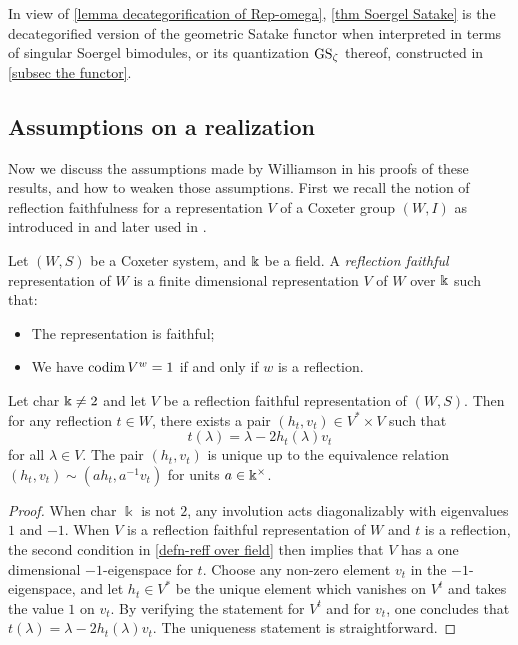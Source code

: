 In view of \cref{lemma decategorification of Rep-omega}, \cref{thm Soergel Satake} is the decategorified version of the geometric Satake functor when interpreted in terms of singular Soergel bimodules, or its quantization $\operatorname{GS}_\zeta$ thereof, constructed in \cref{subsec the functor}.

\subsection{Assumptions on a realization}


Now we discuss the assumptions made by Williamson in his proofs of these results, and how to weaken those assumptions.
First we recall the notion of reflection faithfulness for a representation $V$ of a Coxeter group $(W,I)$ as introduced in \cite{Soer07} and later used in \cite{WillSingular}.

\begin{defn}\label{defn-reff over field}
    Let $(W,S)$ be a Coxeter system, and $\Bbbk$ be a field. A \emph{reflection faithful} representation of $W$ is a finite
dimensional representation $V$ of $W$ over $\Bbbk$ such that:
\begin{itemize}
\item The representation is faithful;
\item 
We have $\operatorname{codim} V^w = 1$ if and only if $w$ is a reflection.
\end{itemize}
\end{defn}

\begin{lemma}\label{lemma reff implies (3')}
   Let char $\Bbbk \neq 2$ and let $V$ be a reflection faithful representation of $(W,S)$. Then for any reflection $t \in W$, there exists a pair $(h_t,v_t)\in V^* \times V$ such that 
   \[t(\lambda)=\lambda - 2h_t(\lambda)v_t\]
   for all $\lambda\in V$. The pair $(h_t, v_t)$ is unique up to the equivalence relation $(h_t, v_t) \sim (a h_t, a^{-1} v_t)$ for units $a \in \Bbbk^{\times}$.
\end{lemma}

\begin{proof}
When char $\Bbbk$ is not $2$, any involution acts diagonalizably with eigenvalues $1$ and $-1$.
When $V$ is a reflection faithful representation of $W$ and $t$ is a reflection, the second condition in \cref{defn-reff over field} then implies that $V$ has a one dimensional $-1$-eigenspace for $t$. Choose any non-zero element $v_t$ in the $-1$-eigenspace, and let $h_t \in V^*$ be the unique element which vanishes on $V^t$ and takes the value $1$ on $v_t$. By verifying the statement for $V^t$ and for $v_t$, one concludes that $t(\lambda)=\lambda - 2h_t(\lambda)v_t$. The uniqueness statement is straightforward.
\end{proof}


